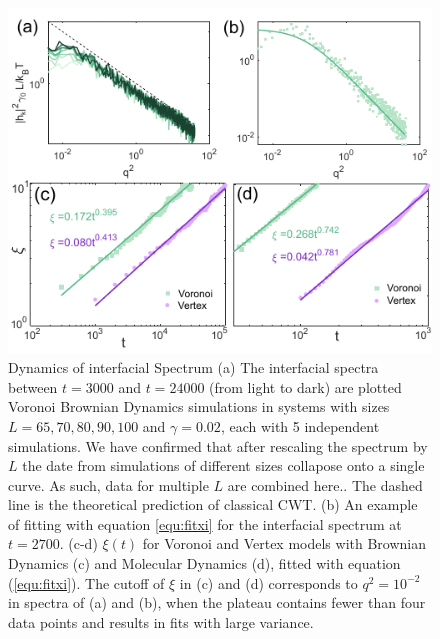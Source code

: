 \documentclass[twoside,twocolumn,9pt]{article}
\begin{document}
\begin{figure}[t]
    \centering
    \includegraphics[width=0.9\columnwidth]{Figure2.pdf}
    \caption{Dynamics of interfacial Spectrum (a) The interfacial spectra between $t=3000$ and $t=24000$ (from light to dark) are plotted Voronoi Brownian Dynamics simulations in systems with sizes $L=65, 70, 80, 90, 100$ and $\gamma=0.02$, each with 5 independent simulations. We have confirmed that after rescaling the spectrum by $L$ the date from simulations of different sizes collapose onto a single curve. As such, data for multiple $L$ are combined here.. The dashed line is the theoretical prediction of classical CWT. (b) An example of fitting with equation \ref{equ:fitxi} for the interfacial spectrum at $t=2700$. (c-d) $\xi(t)$ for Voronoi and Vertex models with Brownian Dynamics (c) and Molecular Dynamics (d), fitted with equation (\ref{equ:fitxi}). The cutoff of $\xi$ in (c) and (d) corresponds to $q^2=10^{-2}$ in spectra of (a) and (b), when the plateau contains fewer than four data points and results in fits with large variance.}
    \label{fig:xi_time}
\end{figure}
\end{document}
